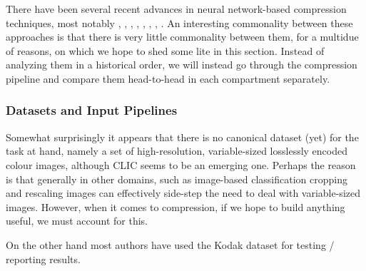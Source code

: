\documentclass{article}
\begin{document}
There have been several recent advances in neural network-based compression
techniques, most notably \cite{toderici2015variable}, \cite{balle2016end},
\cite{toderici2017full}, \cite{theis2017lossy}, \cite{rippel2017real},
\cite{balle2018variational}, \cite{johnston2018cvpr}, \cite{mentzer2018cvpr}. 
An interesting commonality between these approaches is that there is very little
commonality between them, for a multidue of reasons, on which we hope to shed
some lite in this section. Instead of analyzing them in a historical order, we
will instead go through the compression pipeline and compare them head-to-head
in each compartment separately. 
\subsubsection{Datasets and Input Pipelines}
\par
Somewhat surprisingly it appears that there is no canonical dataset (yet) for
the task at hand, namely a set of high-resolution, variable-sized losslessly
encoded colour images,
although CLIC \cite{clic2018} seems to be an emerging one. Perhaps the reason is
that generally in other domains, such as image-based classification cropping and
rescaling images can effectively side-step the need to deal with variable-sized
images. However, when it comes to compression, if we hope to build anything
useful, we must account for this.
\par
On the other hand most authors have used the Kodak dataset \cite{kodakdataset}
for testing / reporting results.
\end{document}
